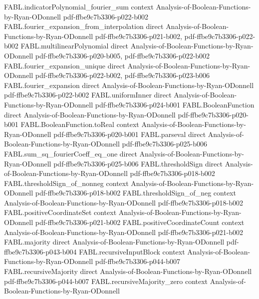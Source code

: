 \begin{theorem}
\proofstep
  {FABL.indicatorPolynomial_fourier_sum}
  {context}
  {Analysis-of-Boolean-Functions-by-Ryan-ODonnell}
  {pdf-ffbe9c7b3306-p022-b002}
\proofstep
  {FABL.fourier_expansion_from_interpolation}
  {direct}
  {Analysis-of-Boolean-Functions-by-Ryan-ODonnell}
  {pdf-ffbe9c7b3306-p021-b002,
    pdf-ffbe9c7b3306-p022-b002}
\proofstep
  {FABL.multilinearPolynomial}
  {direct}
  {Analysis-of-Boolean-Functions-by-Ryan-ODonnell}
  {pdf-ffbe9c7b3306-p020-b005,
    pdf-ffbe9c7b3306-p022-b002}
\proofstep
  {FABL.fourier_expansion_unique}
  {direct}
  {Analysis-of-Boolean-Functions-by-Ryan-ODonnell}
  {pdf-ffbe9c7b3306-p022-b002,
    pdf-ffbe9c7b3306-p023-b006}
\proofstep
  {FABL.fourier_expansion}
  {direct}
  {Analysis-of-Boolean-Functions-by-Ryan-ODonnell}
  {pdf-ffbe9c7b3306-p022-b002}
\proofstep
  {FABL.uniformInner}
  {direct}
  {Analysis-of-Boolean-Functions-by-Ryan-ODonnell}
  {pdf-ffbe9c7b3306-p024-b001}
\proofstep
  {FABL.BooleanFunction}
  {direct}
  {Analysis-of-Boolean-Functions-by-Ryan-ODonnell}
  {pdf-ffbe9c7b3306-p020-b001}
\proofstep
  {FABL.BooleanFunction.toReal}
  {context}
  {Analysis-of-Boolean-Functions-by-Ryan-ODonnell}
  {pdf-ffbe9c7b3306-p020-b001}
\proofstep
  {FABL.parseval}
  {direct}
  {Analysis-of-Boolean-Functions-by-Ryan-ODonnell}
  {pdf-ffbe9c7b3306-p025-b006}
\proofstep
  {FABL.sum_sq_fourierCoeff_eq_one}
  {direct}
  {Analysis-of-Boolean-Functions-by-Ryan-ODonnell}
  {pdf-ffbe9c7b3306-p025-b006}
\proofstep
  {FABL.thresholdSign}
  {direct}
  {Analysis-of-Boolean-Functions-by-Ryan-ODonnell}
  {pdf-ffbe9c7b3306-p018-b002}
\proofstep
  {FABL.thresholdSign_of_nonneg}
  {context}
  {Analysis-of-Boolean-Functions-by-Ryan-ODonnell}
  {pdf-ffbe9c7b3306-p018-b002}
\proofstep
  {FABL.thresholdSign_of_neg}
  {context}
  {Analysis-of-Boolean-Functions-by-Ryan-ODonnell}
  {pdf-ffbe9c7b3306-p018-b002}
\proofstep
  {FABL.positiveCoordinateSet}
  {context}
  {Analysis-of-Boolean-Functions-by-Ryan-ODonnell}
  {pdf-ffbe9c7b3306-p021-b002}
\proofstep
  {FABL.positiveCoordinateCount}
  {context}
  {Analysis-of-Boolean-Functions-by-Ryan-ODonnell}
  {pdf-ffbe9c7b3306-p021-b002}
\proofstep
  {FABL.majority}
  {direct}
  {Analysis-of-Boolean-Functions-by-Ryan-ODonnell}
  {pdf-ffbe9c7b3306-p043-b004}
\proofstep
  {FABL.recursiveInputBlock}
  {context}
  {Analysis-of-Boolean-Functions-by-Ryan-ODonnell}
  {pdf-ffbe9c7b3306-p044-b007}
\proofstep
  {FABL.recursiveMajority}
  {direct}
  {Analysis-of-Boolean-Functions-by-Ryan-ODonnell}
  {pdf-ffbe9c7b3306-p044-b007}
\proofstep
  {FABL.recursiveMajority_zero}
  {context}
  {Analysis-of-Boolean-Functions-by-Ryan-ODonnell}

\end{theorem}
